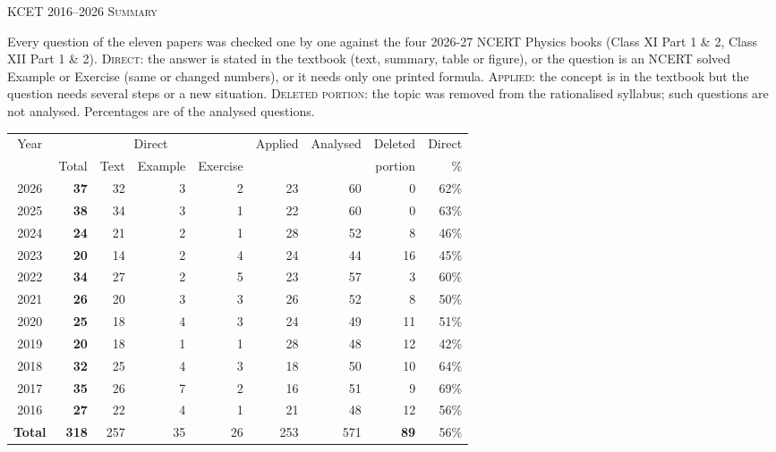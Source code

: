 \clearpage\gdef\curyear{2016--2026 \textperiodcentered{} Summary}
\begin{center}{}\par
{\fontsize{20}{24}\selectfont\color{navy}\scshape KCET 2016--2026 \textperiodcentered{} Summary}\par
{\color{gilt}}\end{center}\label{psummary}
\vspace{6pt}
{\small Every question of the eleven papers was checked one by one against the four 2026-27 NCERT Physics books (Class XI Part 1 \& 2, Class XII Part 1 \& 2). \textsc{Direct}: the answer is stated in the textbook (text, summary, table or figure), or the question is an NCERT solved Example or Exercise (same or changed numbers), or it needs only one printed formula. \textsc{Applied}: the concept is in the textbook but the question needs several steps or a new situation. \textsc{Deleted portion}: the topic was removed from the rationalised syllabus; such questions are not analysed. Percentages are of the analysed questions.}\par\medskip
\begin{center}\small
\begin{tabular}{@{}crrrrrrrr@{}}\toprule
Year & \multicolumn{4}{c}{Direct} & Applied & Analysed & Deleted & Direct\\
\cmidrule(lr){2-5}
 & Total & Text & Example & Exercise & & & portion & \%\\\midrule

2026 & \textbf{37} & 32 & 3 & 2 & 23 & 60 & 0 & 62\%\\
2025 & \textbf{38} & 34 & 3 & 1 & 22 & 60 & 0 & 63\%\\
2024 & \textbf{24} & 21 & 2 & 1 & 28 & 52 & 8 & 46\%\\
2023 & \textbf{20} & 14 & 2 & 4 & 24 & 44 & 16 & 45\%\\
2022 & \textbf{34} & 27 & 2 & 5 & 23 & 57 & 3 & 60\%\\
2021 & \textbf{26} & 20 & 3 & 3 & 26 & 52 & 8 & 50\%\\
2020 & \textbf{25} & 18 & 4 & 3 & 24 & 49 & 11 & 51\%\\
2019 & \textbf{20} & 18 & 1 & 1 & 28 & 48 & 12 & 42\%\\
2018 & \textbf{32} & 25 & 4 & 3 & 18 & 50 & 10 & 64\%\\
2017 & \textbf{35} & 26 & 7 & 2 & 16 & 51 & 9 & 69\%\\
2016 & \textbf{27} & 22 & 4 & 1 & 21 & 48 & 12 & 56\%\\
\midrule\textbf{Total} & \textbf{318} & 257 & 35 & 26 & 253 & 571 & \textbf{89} & 56\%\\\bottomrule
\end{tabular}\end{center}\medskip
